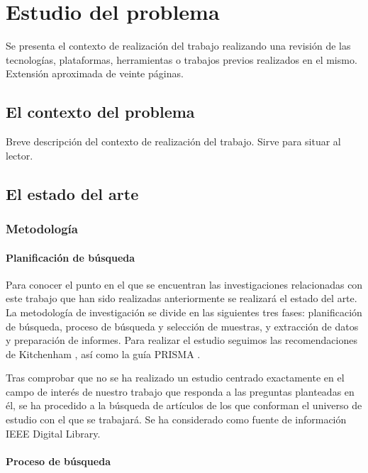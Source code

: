 \documentclass[12pt,a4paper,onecolumn,oneside]{report}
\begin{document}

\chapter{Estudio del problema}
\label{Estudio del problema}

Se presenta el contexto de realización del trabajo realizando una revisión de las tecnologías, plataformas, herramientas o trabajos previos realizados en el mismo. Extensión aproximada de veinte páginas.

\section{El contexto del problema}

Breve descripción del contexto de realización del trabajo. Sirve para situar al lector.


\section{El estado del arte}

\subsection{Metodología}

\subsubsection{Planificación de búsqueda}

Para conocer el punto en el que se encuentran las investigaciones relacionadas con este trabajo que han sido realizadas anteriormente se realizará el estado del arte. La metodología de investigación se divide en las siguientes tres fases: planificación de búsqueda, proceso de búsqueda y selección de muestras, y extracción de datos y preparación de informes. Para realizar el estudio seguimos las recomendaciones de Kitchenham \cite{nueve}, así como la guía PRISMA \cite{diez}. 

Tras comprobar que no se ha realizado un estudio centrado exactamente en el campo de interés de nuestro trabajo que responda a las preguntas planteadas en él, se ha procedido a la búsqueda de artículos de los que conforman el universo de estudio con el que se trabajará. Se ha considerado como fuente de información IEEE Digital Library.

\subsubsection{Proceso de búsqueda}
\end{document}
